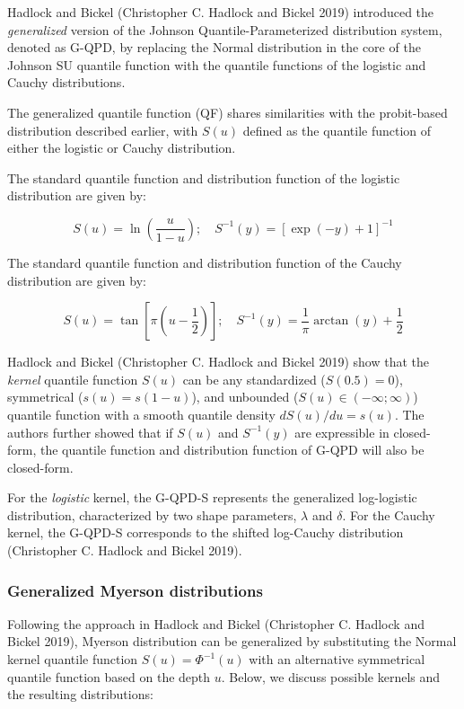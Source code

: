 \documentclass[
]{interact}
\begin{document}
Hadlock and Bickel (Christopher C. Hadlock and Bickel 2019) introduced
the \emph{generalized} version of the Johnson Quantile-Parameterized
distribution system, denoted as G-QPD, by replacing the Normal
distribution in the core of the Johnson SU quantile function with the
quantile functions of the logistic and Cauchy distributions.

The generalized quantile function (QF) shares similarities with the
probit-based distribution described earlier, with \(S(u)\) defined as
the quantile function of either the logistic or Cauchy distribution.

The standard quantile function and distribution function of the logistic
distribution are given by:

\[
S(u)= \ln\left(\frac{u}{1-u}\right);\quad S^{-1}(y)=[\exp(-y)+1]^{-1}
\]

The standard quantile function and distribution function of the Cauchy
distribution are given by:

\[
S(u)= \tan\left[\pi\left(u-\frac{1}{2}\right)\right];\quad S^{-1}(y)=\frac{1}{ \pi}\arctan(y)+\frac{1}{2}
\]

Hadlock and Bickel (Christopher C. Hadlock and Bickel 2019) show that
the \emph{kernel} quantile function \(S(u)\) can be any standardized
(\(S(0.5)=0\)), symmetrical (\(s(u)=s(1-u)\)), and unbounded
(\(S(u)\in(-\infty;\infty)\)) quantile function with a smooth quantile
density \(dS(u)/du=s(u)\). The authors further showed that if \(S(u)\)
and \(S^{-1}(y)\) are expressible in closed-form, the quantile function
and distribution function of G-QPD will also be closed-form.

For the \emph{logistic} kernel, the G-QPD-S represents the generalized
log-logistic distribution, characterized by two shape parameters,
\(\lambda\) and \(\delta\). For the Cauchy kernel, the G-QPD-S
corresponds to the shifted log-Cauchy distribution (Christopher C.
Hadlock and Bickel 2019).

\subsubsection{Generalized Myerson distributions}\label{sec-genmyerson}

Following the approach in Hadlock and Bickel (Christopher C. Hadlock and
Bickel 2019), Myerson distribution can be generalized by substituting
the Normal kernel quantile function \(S(u)=\Phi^{-1}(u)\) with an
alternative symmetrical quantile function based on the depth \(u\).
Below, we discuss possible kernels and the resulting distributions:
\end{document}
